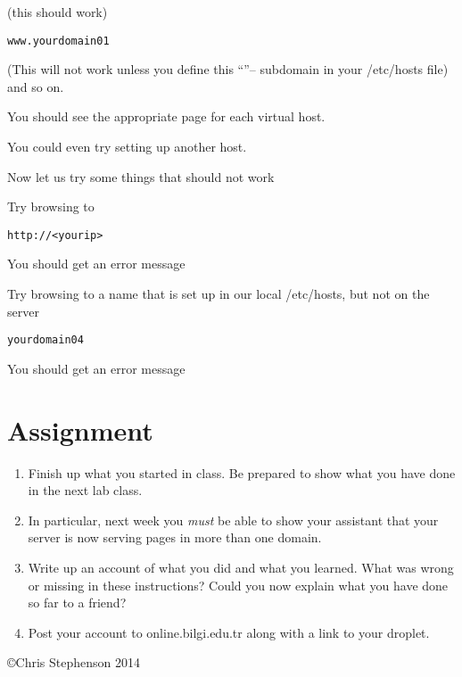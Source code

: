 \documentclass[12pt, a4paper]{article}
\begin{document}
(this should work)
\begin{verbatim}
www.yourdomain01
\end{verbatim}



(This will not work unless you define this                                                                                                                 “”-- 
subdomain in your /etc/hosts file)
and so on.

You should see the appropriate page for each virtual host.

You could even try setting up another host.

Now let us try some things that should not work

Try browsing to

\begin{verbatim}
http://<yourip>
\end{verbatim}


You should get an error message

Try browsing to a name that is set up in our local /etc/hosts, but not on the server  

\begin{verbatim}
yourdomain04
\end{verbatim}


You should get an error message


\section*{Assignment}


\begin{enumerate}
\item Finish up what you started in class. Be prepared to show what you have done in the next lab class. 
\item In particular, next week you \emph{must} be able to show your assistant that your server is now serving pages in more than one domain.
\item Write up an account of what you did and what you learned. What was wrong or missing in these instructions? Could you now explain what you have done so far to a friend?
\item Post your account to online.bilgi.edu.tr along with a link to your droplet.

\end{enumerate}

\copyright Chris Stephenson 2014
\end{document}
